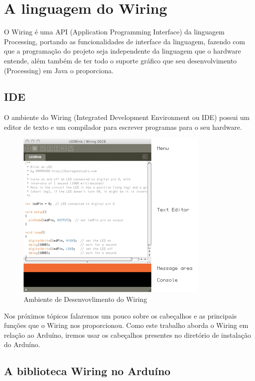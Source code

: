 \section{A linguagem do Wiring}

O Wiring é uma API (Application Programming Interface) da linguagem Processing, portando as funcionalidades de interface da linguagem, fazendo com que a programação do projeto seja independente da linguagem que o hardware entende, além também de ter todo o suporte gráfico que seu desenvolvimento (Processing) em Java o proporciona. 

\subsection{IDE }

O ambiente do Wiring (Integrated Development Environment ou IDE) possui um editor de texto e um compilador para escrever programas para o seu hardware. 

\begin{figure}[htb]
	\caption{\label{wiringIDE}Ambiente de Desenvovlimento do Wiring}
	\begin{center}
	    \includegraphics[scale=0.9]{artigo/refs/ide.jpeg}
	\end{center}
\end{figure}

Nos próximos tópicos falaremos um pouco sobre os cabeçalhos e as principais funções que o Wiring nos proporcionou. Como este trabalho aborda o Wiring em relação ao Arduíno, iremos usar os cabeçalhos presentes no diretório de instalação do Arduíno.

\subsection{A biblioteca Wiring no Arduíno}

